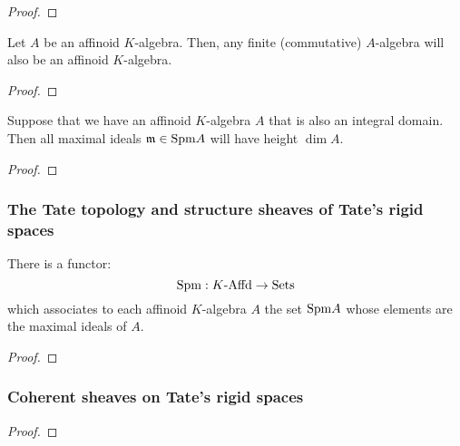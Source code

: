                 \begin{proof}
                    
                \end{proof}
            \begin{corollary}
                Let $A$ be an affinoid $K$-algebra. Then, any finite (commutative) $A$-algebra will also be an affinoid $K$-algebra. 
            \end{corollary}
                \begin{proof}
                    
                \end{proof}
            \begin{corollary}
                Suppose that we have an affinoid $K$-algebra $A$ that is also an integral domain. Then all maximal ideals $\mathfrak{m} \in \mathrm{Spm} A$ will have height $\dim A$.
            \end{corollary}
                \begin{proof}
                    
                \end{proof}
        
        \subsubsection{The Tate topology and structure sheaves of Tate's rigid spaces}
            \begin{proposition} \label{prop: maximal_spectra_of_affinoid_algebras}
                There is a functor:
                    $$\mathrm{Spm}: K\text{-}\mathrm{Affd} \to \mathrm{Sets}$$
                which associates to each affinoid $K$-algebra $A$ the set $\mathrm{Spm} A$ whose elements are the maximal ideals of $A$. 
            \end{proposition}
                \begin{proof}
                    
                \end{proof}
            \begin{definition} \label{def: the_canonical_topology_for_affinoid_algebras}
                
            \end{definition}
        
        \subsubsection{Coherent sheaves on Tate's rigid spaces}
            \begin{theorem} \label{theorem: tate_acyclicity_theorem_for_rigid_spaces}
                
            \end{theorem}
                \begin{proof}
                    
                \end{proof}
    

